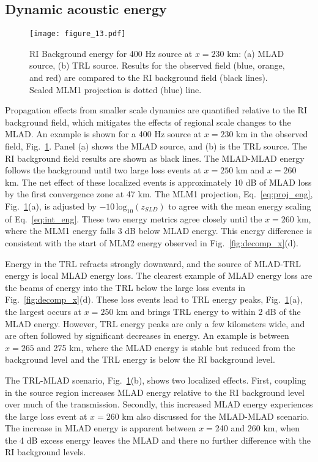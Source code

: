 \documentclass[preprint,NumberedRefs]{JASA}
\begin{document}
\subsection{Dynamic acoustic energy}\label{ssec:blocking}
\begin{figure}
\texttt{[image: figure\_13.pdf]}
    \caption{RI Background energy for 400 Hz source at $x=230$ km: (a) MLAD source, (b) TRL source. Results for the observed field (blue, orange, and red) are compared to the RI background field (black lines). Scaled MLM1 projection is dotted (blue) line.}
    \label{fig:ml_energy}
\end{figure}

Propagation effects from smaller scale dynamics are quantified relative to the RI background field, which mitigates the effects of regional scale changes to the MLAD. An example is shown for a 400 Hz source at $x=230$ km in the observed field, Fig.~\ref{fig:ml_energy}. Panel (a) shows the MLAD source, and (b) is the TRL source. The RI background field results are shown as black lines. The MLAD-MLAD energy follows the background until two large loss events at $x=250$ km and $x=260$ km. The net effect of these localized events is approximately 10 dB of MLAD loss by the first convergence zone at 47 km. The MLM1 projection, Eq.~\eqref{eq:proj_eng}, Fig.~\ref{fig:ml_energy}(a), is adjusted by $-10 \, \textrm{log}_{10}(z_{SLD})$ to agree with the mean energy scaling of Eq.~\eqref{eq:int_eng}. These two energy metrics agree closely until the $x=260$ km, where the MLM1 energy falls 3 dB below MLAD energy. This energy difference is consistent with the start of MLM2 energy observed in Fig.~\ref{fig:decomp_x}(d).

Energy in the TRL refracts strongly downward, and the source of MLAD-TRL energy is local MLAD energy loss. The clearest example of MLAD energy loss are the beams of energy into the TRL below the large loss events in Fig.~\ref{fig:decomp_x}(d). These loss events lead to TRL energy peaks, Fig.~\ref{fig:ml_energy}(a), the largest occurs at $x=250$ km and brings TRL energy to within 2 dB of the MLAD energy. However, TRL energy peaks are only a few kilometers wide, and are often followed by significant decreases in energy. An example is between $x=265$ and 275 km, where the MLAD energy is stable but reduced from the background level and the TRL energy is below the RI background level.

The TRL-MLAD scenario, Fig.~\ref{fig:ml_energy}(b), shows two localized effects. First, coupling in the source region increases MLAD energy relative to the RI background level over much of the transmission. Secondly, this increased MLAD energy experiences the large loss event at $x=260$ km also discussed for the MLAD-MLAD scenario. The increase in MLAD energy is apparent between $x=$240 and 260 km, when the 4 dB excess energy leaves the MLAD and there no further difference with the RI background levels.
\end{document}
